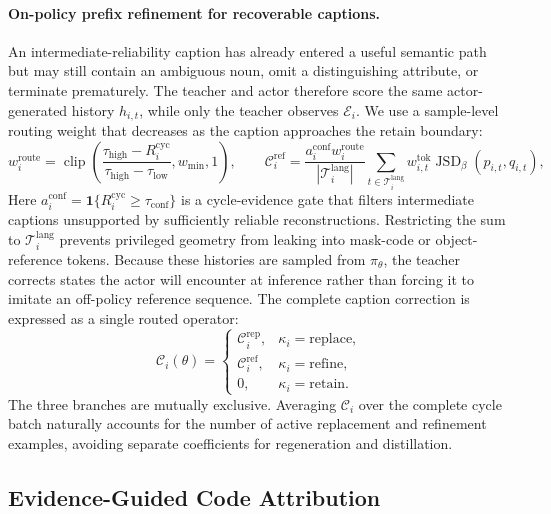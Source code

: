 \documentclass{article}
\begin{document}
\paragraph{On-policy prefix refinement for recoverable captions.}
An intermediate-reliability caption has already entered a useful semantic path but may still contain an ambiguous noun, omit a distinguishing attribute, or terminate prematurely. The teacher and actor therefore score the same actor-generated history $h_{i,t}$, while only the teacher observes $\mathcal E_i$. We use a sample-level routing weight that decreases as the caption approaches the retain boundary:
\begin{equation}\label{eq:opd}
 w_i^{\mathrm{route}}=\operatorname{clip}\!\left(
 \frac{\tau_{\mathrm{high}}-R_i^{\mathrm{cyc}}}{\tau_{\mathrm{high}}-\tau_{\mathrm{low}}},w_{\min},1
 \right),\qquad
 \mathcal C_i^{\mathrm{ref}}=
 \frac{a_i^{\mathrm{conf}}w_i^{\mathrm{route}}}{|\mathcal T_i^{\mathrm{lang}}|}
 \sum_{t\in\mathcal T_i^{\mathrm{lang}}}w_{i,t}^{\mathrm{tok}}
 \operatorname{JSD}_{\beta}(p_{i,t},q_{i,t}),
\end{equation}
Here $a_i^{\mathrm{conf}}=\mathbf 1\{R_i^{\mathrm{cyc}}\ge\tau_{\mathrm{conf}}\}$ is a cycle-evidence gate that filters intermediate captions unsupported by sufficiently reliable reconstructions. Restricting the sum to $\mathcal T_i^{\mathrm{lang}}$ prevents privileged geometry from leaking into mask-code or object-reference tokens. Because these histories are sampled from $\pi_\theta$, the teacher corrects states the actor will encounter at inference rather than forcing it to imitate an off-policy reference sequence. The complete caption correction is expressed as a single routed operator:
\begin{equation}\label{eq:routed-correction}
 \mathcal C_i(\theta)=
 \begin{cases}
  \mathcal C_i^{\mathrm{rep}}, & \kappa_i=\mathrm{replace},\\
  \mathcal C_i^{\mathrm{ref}}, & \kappa_i=\mathrm{refine},\\
  0, & \kappa_i=\mathrm{retain}.
 \end{cases}
\end{equation}
The three branches are mutually exclusive. Averaging $\mathcal C_i$ over the complete cycle batch naturally accounts for the number of active replacement and refinement examples, avoiding separate coefficients for regeneration and distillation.

\subsection{Evidence-Guided Code Attribution}\label{sec:egca}
\end{document}
